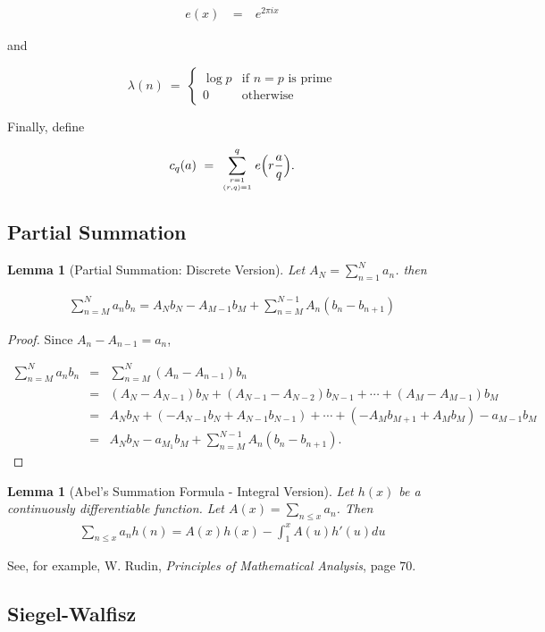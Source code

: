 \documentclass[12pt,letterpaper]{report}
\newcommand\be{\begin{equation}}
\newcommand\ee{\end{equation}}
\newcommand\bea{\begin{eqnarray}}
\newcommand\eea{\end{eqnarray}}
\newtheorem{lem}[thm]{Lemma}
\newcommand{\twocase}[5]{#1 \begin{cases} #2 & \text{#3}\\ #4
&\text{#5} \end{cases}   }
\newcommand{\gl}{\lambda}
\begin{document}
\bea e(x) & \ = \ & e^{2\pi i x}  \eea

and

\be \twocase{\gl(n) \ = \ }{\log p}{if $n = p$ is
prime}{0}{otherwise} \ee

Finally, define

\be c_q(a) \ = \ \sum_{r = 1 \atop (r,q)=1}^q e\Big( r\frac{a}{q}
\Big). \ee

\subsection{Partial Summation}

\begin{lem}[Partial Summation: Discrete
Version] Let $A_N = \sum_{n=1}^N a_n$. then

\begin{eqnarray}
\sum_{n=M}^N a_n b_n = A_N b_N - A_{M-1} b_M + \sum_{n=M}^{N-1}
A_n (b_n - b_{n+1})
\end{eqnarray}

\end{lem}

\begin{proof}

Since $A_n - A_{n-1} = a_n$,

\bea
\sum_{n=M}^N a_n b_n &= & \sum_{n=M}^N (A_n-A_{n-1}) b_n \nonumber\\
&= & (A_N - A_{N-1}) b_N + (A_{N-1} - A_{N-2}) b_{N-1} +\dotsb +
(A_M - A_{M-1}) b_M \nonumber\\ &= & A_N b_N + (- A_{N-1} b_N +
A_{N-1} b_{N-1})
+ \dotsb + (-A_M b_{M+1} + A_M b_M) - a_{M-1} b_M \nonumber\\
&= & A_N b_N - a_{M_1} b_M + \sum_{n=M}^{N-1} A_n (b_n - b_{n+1}).
\eea

\end{proof}

\begin{lem}[Abel's Summation Formula - Integral
Version] Let $h(x)$ be a continuously differentiable function. Let
$A(x) = \sum_{n \leq x} a_n$. Then
\begin{eqnarray}
\sum_{n \leq x} a_n h(n) = A(x) h(x) - \int_1^x A(u) h'(u) du
\end{eqnarray}
\end{lem}

See, for example, W. Rudin, \emph{Principles of Mathematical
Analysis}, page $70$.



\subsection{Siegel-Walfisz}
\end{document}
